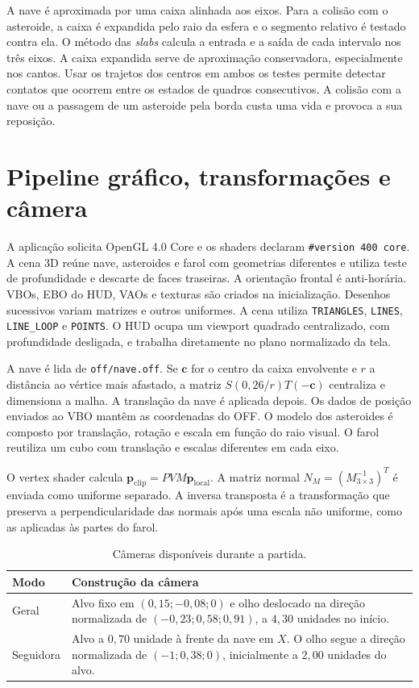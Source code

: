 \documentclass[12pt,a4paper]{article}
\begin{document}
A nave é aproximada por uma caixa alinhada aos eixos. Para a colisão com o asteroide, a caixa é expandida pelo raio da esfera e o segmento relativo é testado contra ela. O método das \emph{slabs} calcula a entrada e a saída de cada intervalo nos três eixos. A caixa expandida serve de aproximação conservadora, especialmente nos cantos. Usar os trajetos dos centros em ambos os testes permite detectar contatos que ocorrem entre os estados de quadros consecutivos. A colisão com a nave ou a passagem de um asteroide pela borda custa uma vida e provoca a sua reposição.

\section{Pipeline gráfico, transformações e câmera}

A aplicação solicita OpenGL 4.0 Core e os shaders declaram \texttt{\#version 400 core}. A cena 3D reúne nave, asteroides e farol com geometrias diferentes e utiliza teste de profundidade e descarte de faces traseiras. A orientação frontal é anti-horária. VBOs, EBO do HUD, VAOs e texturas são criados na inicialização. Desenhos sucessivos variam matrizes e outros uniformes. A cena utiliza \texttt{TRIANGLES}, \texttt{LINES}, \texttt{LINE\_LOOP} e \texttt{POINTS}. O HUD ocupa um viewport quadrado centralizado, com profundidade desligada, e trabalha diretamente no plano normalizado da tela.

A nave é lida de \texttt{off/nave.off}. Se $\mathbf{c}$ for o centro da caixa envolvente e $r$ a distância ao vértice mais afastado, a matriz $S(0{,}26/r)T(-\mathbf{c})$ centraliza e dimensiona a malha. A translação da nave é aplicada depois. Os dados de posição enviados ao VBO mantêm as coordenadas do OFF. O modelo dos asteroides é composto por translação, rotação e escala em função do raio visual. O farol reutiliza um cubo com translação e escalas diferentes em cada eixo.

O vertex shader calcula $\mathbf{p}_{\mathrm{clip}}=PVM\mathbf{p}_{\mathrm{local}}$. A matriz normal $N_M=(M_{3\times3}^{-1})^T$ é enviada como uniforme separado. A inversa transposta é a transformação que preserva a perpendicularidade das normais após uma escala não uniforme, como as aplicadas às partes do farol.

\begin{table}[H]
\centering\small
\begin{tabularx}{\textwidth}{>{\raggedright\arraybackslash}p{3.0cm}X}
\toprule
Modo & Construção da câmera \\
\midrule
Geral & Alvo fixo em $(0{,}15;-0{,}08;0)$ e olho deslocado na direção normalizada de $(-0{,}23;0{,}58;0{,}91)$, a $4{,}30$ unidades no início. \\
Seguidora & Alvo a $0{,}70$ unidade à frente da nave em $X$. O olho segue a direção normalizada de $(-1;0{,}38;0)$, inicialmente a $2{,}00$ unidades do alvo. \\
\bottomrule
\end{tabularx}
\caption{Câmeras disponíveis durante a partida.}
\end{table}
\end{document}
